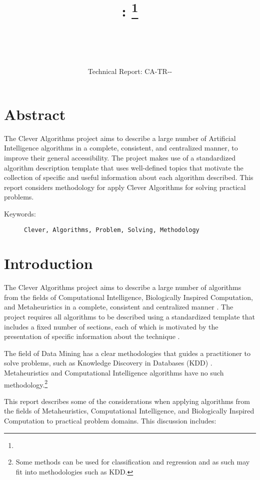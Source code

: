 \documentclass[a4paper, 11pt]{article}
\title{{\myreporttitle}: {\myreportsubtitle}\footnote{\myreportlicense}}
\author{\myreportauthor\\{\myreportemail}\\\small\myreportproject}
\date{\myreportfulldate\\{\small{Technical Report: CA-TR-{\myreportdate}-\myreportversion}}}
\begin{document}
\maketitle

\section*{Abstract} 
The Clever Algorithms project aims to describe a large number of Artificial Intelligence algorithms in a complete, consistent, and centralized manner, to improve their general accessibility. 
The project makes use of a standardized algorithm description template that uses well-defined topics that motivate the collection of specific and useful information about each algorithm described.
This report considers methodology for apply Clever Algorithms for solving practical problems.

\begin{description}
	\item[Keywords:] {\small\texttt{Clever, Algorithms, Problem, Solving, Methodology}}
\end{description} 

\section{Introduction}
\label{sec:introduction}
The Clever Algorithms project aims to describe a large number of algorithms from the fields of Computational Intelligence, Biologically Inspired Computation, and Metaheuristics in a complete, consistent and centralized manner \cite{Brownlee2010}.
The project requires all algorithms to be described using a standardized template that includes a fixed number of sections, each of which is motivated by the presentation of specific information about the technique \cite{Brownlee2010a}.

The field of Data Mining has a clear methodologies that guides a practitioner to solve problems, such as Knowledge Discovery in Databases (KDD) \cite{Fayyad1996}. Metaheuristics and Computational Intelligence algorithms have no such methodology.\footnote{Some methods can be used for classification and regression and as such may fit into methodologies such as KDD.}

This report describes some of the considerations when applying algorithms from the fields of Metaheuristics, Computational Intelligence, and Biologically Inspired Computation to practical problem domains. This discussion includes:
\end{document}
